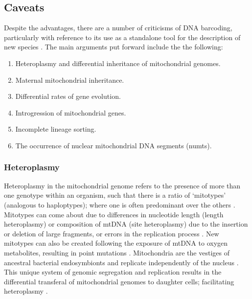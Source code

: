 \subsection{Caveats}

Despite the advantages, there are a number of criticisms of DNA barcoding, particularly with reference to its use as a standalone tool for the description of new species \citep{Rubinoff2006a}. The main arguments put forward include the the following: \vspace{0.4cm}

\begin{enumerate}
    \item Heteroplasmy and differential inheritance of mitochondrial genomes.
    \item Maternal mitochondrial inheritance.
    \item Differential rates of gene evolution.
    \item Introgression of mitochondrial genes.
    \item Incomplete lineage sorting.
    \item The occurrence of nuclear mitochondrial DNA segments (numts).
\end{enumerate}

\subsubsection{Heteroplasmy}
Heteroplasmy in the mitochondrial genome refers to the presence of more than one genotype within an organism, such that there is a ratio of `mitotypes' (analogous to haploptypes); where one is often predominant over the others \citep{Kmiec2006}. Mitotypes can come about due to differences in nucleotide length (length heteroplasmy) or composition of mtDNA (site heteroplasmy) due to the insertion or deletion of large fragments, or errors in the replication process \citep{Barr2005}. New mitotypes can also be created following the exposure of mtDNA to oxygen metabolites, resulting in point mutations \citep{Kmiec2006}. Mitochondria are the vestiges of ancestral bacterial endosymbionts \citep{Gray1999} and replicate independently of the nucleus \citep{Meusel1993}. This unique system of genomic segregation and replication results in the differential transferal of mitochondrial genomes to daughter cells; facilitating heteroplasmy \citep{Barr2005}. 

